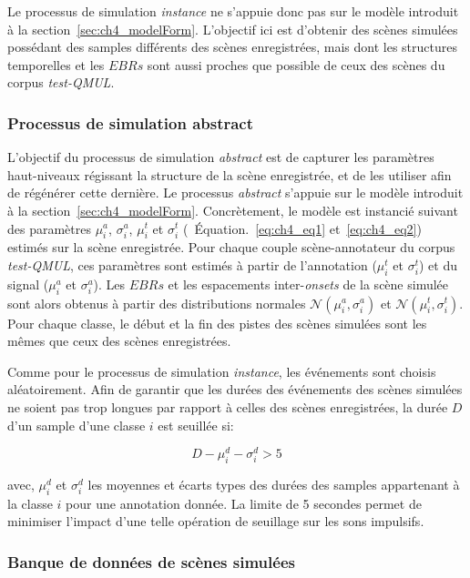 Le processus de simulation \emph{instance} ne s'appuie donc pas sur le modèle introduit à la section~\ref{sec:ch4_modelForm}. L'objectif ici est d’obtenir des scènes simulées possédant des samples différents des scènes enregistrées, mais dont les structures temporelles et les $EBRs$ sont aussi proches que possible de ceux des scènes du corpus \emph{test-QMUL}.

\subsubsection{Processus de simulation abstract}
\label{sec:ch7_simuProcessAbstract}

L'objectif du processus de simulation \emph{abstract} est de capturer les paramètres haut-niveaux régissant la structure de la scène enregistrée, et de les utiliser afin de régénérer cette dernière. Le processus \emph{abstract} s'appuie sur le modèle introduit à la section~\ref{sec:ch4_modelForm}. Concrètement, le modèle est instancié suivant des paramètres $\mu_i^a$, $\sigma_i^a$, $\mu_i^t$ et $\sigma_i^t$ (\cf~Équation.~\ref{eq:ch4_eq1} et~\ref{eq:ch4_eq2}) estimés sur la scène enregistrée. Pour chaque couple scène-annotateur du corpus \emph{test-QMUL}, ces paramètres sont estimés à partir de l'annotation ($\mu_i^t$ et $\sigma_i^t$) et du signal ($\mu_i^a$ et $\sigma_i^a$). Les $EBRs$ et les espacements inter-\emph{onsets} de la scène simulée sont alors obtenus à partir des distributions normales $\mathcal{N}(\mu_i^a,\sigma_i^a)$ et $\mathcal{N}(\mu_i^t,\sigma_i^t)$. Pour chaque classe, le début et la fin des pistes des scènes simulées sont les mêmes que ceux des scènes enregistrées.

Comme pour le processus de simulation \emph{instance}, les événements sont choisis aléatoirement. Afin de garantir que les durées des événements des scènes simulées ne soient pas trop longues par rapport à celles des scènes enregistrées, la durée $D$ d'un sample d'une classe $i$ est seuillée si:

\begin{equation}
D-\mu_i^d-\sigma_i^d>5
\end{equation}

avec, $\mu_i^d$ et $\sigma_i^d$ les moyennes et écarts types des durées des samples appartenant à la classe $i$ pour une annotation donnée. La limite de 5 secondes permet de minimiser l'impact d'une telle opération de seuillage sur les sons impulsifs.

\subsubsection{Banque de données de scènes simulées}
\label{sec:ch7_datasetEtEbr}

